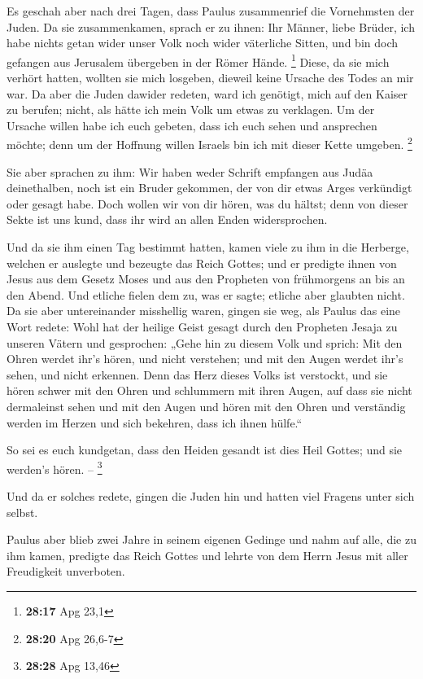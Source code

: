  Es geschah aber nach drei Tagen, dass Paulus zusammenrief
die Vornehmsten der Juden. Da sie zusammenkamen, sprach er zu ihnen: Ihr
Männer, liebe Brüder, ich habe nichts getan wider unser Volk noch wider
väterliche Sitten, und bin doch gefangen aus Jerusalem übergeben in der
Römer Hände. \footnote{\textbf{28:17} Apg 23,1}  Diese, da
sie mich verhört hatten, wollten sie mich losgeben, dieweil keine
Ursache des Todes an mir war.  Da aber die Juden dawider
redeten, ward ich genötigt, mich auf den Kaiser zu berufen; nicht, als
hätte ich mein Volk um etwas zu verklagen.  Um der Ursache
willen habe ich euch gebeten, dass ich euch sehen und ansprechen möchte;
denn um der Hoffnung willen Israels bin ich mit dieser Kette umgeben.
\footnote{\textbf{28:20} Apg 26,6-7}

 Sie aber sprachen zu ihm: Wir haben weder Schrift
empfangen aus Judäa deinethalben, noch ist ein Bruder gekommen, der von
dir etwas Arges verkündigt oder gesagt habe.  Doch wollen
wir von dir hören, was du hältst; denn von dieser Sekte ist uns kund,
dass ihr wird an allen Enden widersprochen.

 Und da sie ihm einen Tag bestimmt hatten, kamen viele zu
ihm in die Herberge, welchen er auslegte und bezeugte das Reich Gottes;
und er predigte ihnen von Jesus aus dem Gesetz Moses und aus den
Propheten von frühmorgens an bis an den Abend.  Und etliche
fielen dem zu, was er sagte; etliche aber glaubten nicht. 
Da sie aber untereinander misshellig waren, gingen sie weg, als Paulus
das eine Wort redete: Wohl hat der heilige Geist gesagt durch den
Propheten Jesaja zu unseren Vätern  und gesprochen: „Gehe
hin zu diesem Volk und sprich: Mit den Ohren werdet ihr's hören, und
nicht verstehen; und mit den Augen werdet ihr's sehen, und nicht
erkennen.  Denn das Herz dieses Volks ist verstockt, und
sie hören schwer mit den Ohren und schlummern mit ihren Augen, auf dass
sie nicht dermaleinst sehen und mit den Augen und hören mit den Ohren
und verständig werden im Herzen und sich bekehren, dass ich ihnen
hülfe.``

 So sei es euch kundgetan, dass den Heiden gesandt ist dies
Heil Gottes; und sie werden's hören. -- \footnote{\textbf{28:28} Apg
  13,46}

 Und da er solches redete, gingen die Juden hin und hatten
viel Fragens unter sich selbst.

 Paulus aber blieb zwei Jahre in seinem eigenen Gedinge und
nahm auf alle, die zu ihm kamen,  predigte das Reich Gottes
und lehrte von dem Herrn Jesus mit aller Freudigkeit unverboten.

